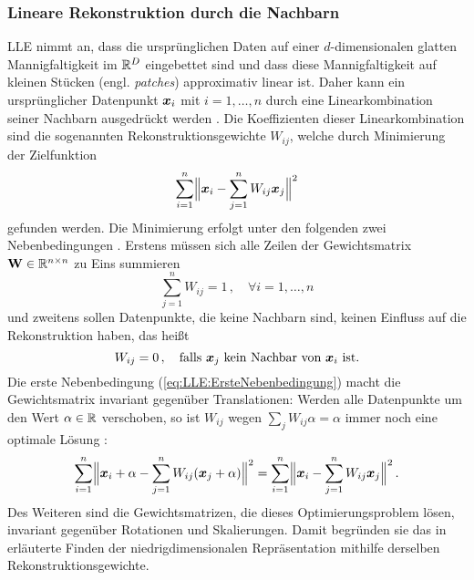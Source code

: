 \subsubsection{Lineare Rekonstruktion durch die Nachbarn}
\label{ch:MethodenDerDimRed:statistisch:LLE:LineareRekonstruktion}
LLE nimmt an, dass die ursprünglichen Daten auf einer $d$-dimensionalen glatten Mannigfaltigkeit im $\real^D$ eingebettet sind und dass diese Mannigfaltigkeit auf kleinen Stücken (engl. \textit{patches}) approximativ linear ist. Daher kann ein ursprünglicher Datenpunkt $\vect{x}_i$ mit $i = 1,\ldots,n$ durch eine Linearkombination seiner Nachbarn
ausgedrückt werden \parencite[2323]{Roweis.2000}. Die Koeffizienten dieser Linearkombination sind die sogenannten
Rekonstruktionsgewichte $W_{ij}$, welche durch Minimierung der Zielfunktion
\begin{equation}
	\label{eq:LLE:Zielfunktion}
	\sum_{i = 1}^n \norm[\Big]{ \vect{x}_i - \sum_{j = 1}^n W_{ij}\vect{x}_j}^2
\end{equation}
gefunden werden. Die Minimierung erfolgt unter den folgenden zwei Nebenbedingungen \parencite[2]{Roweis.2000}. Erstens müssen sich alle Zeilen der Gewichtsmatrix $\mat{W} \in \real^{n
		\times n}$ zu Eins summieren
\begin{equation}
	\label{eq:LLE:ErsteNebenbedingung}
	\sum_{j = 1}^nW_{ij} = 1 \, , \quad \forall i = 1, \ldots, n
\end{equation}
und zweitens sollen Datenpunkte, die keine Nachbarn sind, keinen Einfluss auf die Rekonstruktion haben, das heißt
\begin{equation}
	\label{eq:LLE:ZweiteNebenbedingung}
	W_{ij} = 0 \, , \quad \text{falls } \vect{x}_j \text{ kein Nachbar von } \vect{x}_i \text{ ist.}
\end{equation}
Die erste Nebenbedingung (\eqref{eq:LLE:ErsteNebenbedingung}) macht die Gewichtsmatrix invariant gegenüber Translationen: Werden alle Datenpunkte um den Wert $\alpha \in \real$ verschoben, so ist $W_{ij}$ wegen $\sum_j W_{ij}\alpha = \alpha$ immer noch eine optimale Lösung \parencite[8]{Cayton.2005}:
\begin{equation}
	\sum_{i = 1}^n \norm[\Big]{ \vect{x}_i + \alpha - \sum_{j = 1}^n W_{ij}(\vect{x}_j + \alpha)}^2 = \sum_{i = 1}^n \norm[\Big]{ \vect{x}_i - \sum_{j = 1}^n W_{ij}\vect{x}_j}^2 \, .
\end{equation}
Des Weiteren sind die Gewichtsmatrizen, die dieses Optimierungsproblem lösen, invariant gegenüber Rotationen und Skalierungen. Damit begründen sie das in  erläuterte Finden der niedrigdimensionalen Repräsentation mithilfe derselben Rekonstruktionsgewichte.


